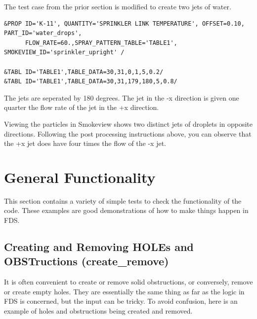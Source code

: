 \documentclass[11pt]{book}
\begin{document}
The test case from the prior section is modified to create two jets of water.

\footnotesize
\begin{verbatim}
&PROP ID='K-11', QUANTITY='SPRINKLER LINK TEMPERATURE', OFFSET=0.10, PART_ID='water_drops',
      FLOW_RATE=60.,SPRAY_PATTERN_TABLE='TABLE1', SMOKEVIEW_ID='sprinkler_upright' /

&TABL ID='TABLE1',TABLE_DATA=30,31,0,1,5,0.2/
&TABL ID='TABLE1',TABLE_DATA=30,31,179,180,5,0.8/
\end{verbatim}
\normalsize

The jets are seperated by 180 degrees.
The jet in the {\ct -x} direction is given one quarter the flow rate of the jet in the {\ct +x} direction.

Viewing the particles in Smokeview shows two distinct jets of droplets in opposite directions.
Following the post processing instructions above,  you can observe that
the {\ct +x} jet does have four times the flow of the {\ct -x} jet.

\clearpage

\section{General Functionality}

This section contains a variety of simple tests to check the functionality of the code. These examples are good demonstrations of how to
make things happen in FDS.


\subsection{Creating and Removing {\ct HOLE}s and {\ct OBST}ructions ({\bf create\_remove}) }

It is often convenient to create or remove solid obstructions, or conversely, remove or create empty holes. They are essentially the same thing as far as the logic in
FDS is concerned, but the input can be tricky. To avoid confusion, here is an example of holes and obstructions being created and removed.
\end{document}
